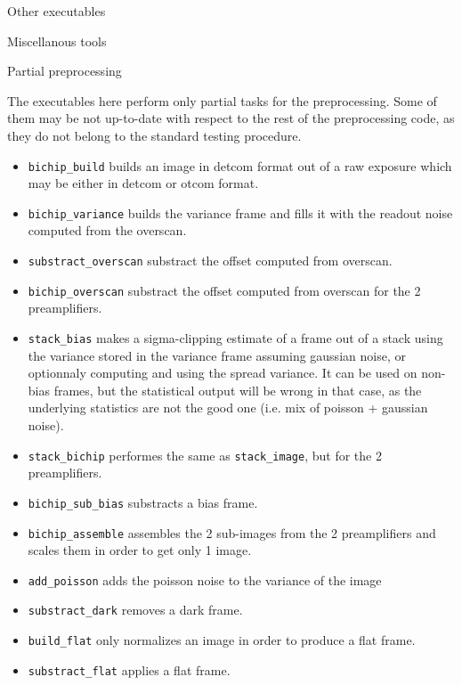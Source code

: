 \begin{subsection}{Other executables}
\begin{subsubsection}{Miscellanous tools}
\end{subsubsection}

\begin{subsubsection}{Partial preprocessing}

The executables here perform only partial tasks for the preprocessing.
Some of them may be not up-to-date with respect to the rest of the
preprocessing code, as they do not belong to the standard testing procedure.
\begin{itemize}
\item {\tt bichip\_build} builds an image in detcom format out of a raw
exposure which may be either in detcom or otcom format.
\item {\tt bichip\_variance} builds the variance frame and fills it
with the readout noise computed from the overscan.
\item {\tt substract\_overscan} substract the offset computed from overscan.
\item {\tt bichip\_overscan} substract the offset computed from
overscan for the 2 preamplifiers.
\item {\tt stack\_bias} makes a sigma-clipping estimate of a frame out
of a stack using the variance stored in the variance frame assuming
gaussian noise, or
optionnaly computing and using the spread variance. It can be used on
non-bias frames, but 
the statistical output will be wrong in that case, as the underlying
statistics are not the good one (i.e. mix of poisson + gaussian
noise).
\item {\tt stack\_bichip} performes the same as {\tt stack\_image}, but
for the 2 preamplifiers.
\item {\tt bichip\_sub\_bias} substracts a bias frame.
\item {\tt bichip\_assemble} assembles the 2 sub-images from the 2
preamplifiers and scales them in order to get only 1 image.
\item {\tt add\_poisson} adds the poisson noise to the variance of the
image
\item {\tt substract\_dark} removes a dark frame.
\item {\tt build\_flat} only normalizes an image in order to produce a
flat frame.
\item {\tt substract\_flat} applies a flat frame.
\end{itemize}
\end{subsubsection}

\end{subsection}

